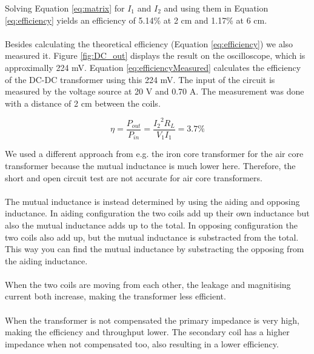 \documentclass[final]{scrreprt} %
\begin{document}
Solving Equation \ref{eq:matrix} for $I_1$ and $I_2$ and using them in Equation \ref{eq:efficiency} yields an efficiency of 5.14\% at 2 cm and 1.17\% at 6 cm.
\\ \\
Besides calculating the theoretical efficiency (Equation \ref{eq:efficiency}) we also measured it. Figure \ref{fig:DC_out} displays the result on the oscilloscope, which is approximally 224 mV. Equation \ref{eq:efficiencyMeasured} calculates the efficiency of the DC-DC transformer using this 224 mV. The input of the circuit is measured by the voltage source at 20 V and 0.70 A. The measurement was done with a distance of 2 cm between the coils.

\begin{equation}
	\eta = \frac{P_{out}}{P_{in}} = \frac{{I_2}^2 R_L}{V_1 I_1} = 3.7\%
	\label{eq:efficiencyMeasured}
\end{equation}

We used a different approach from e.g. the iron core transformer for the air core transformer because the mutual inductance is much lower here. Therefore, the short and open circuit test are not accurate for air core transformers.
\\ \\
The mutual inductance is instead determined by using the aiding and opposing inductance. In aiding configuration the two coils add up their own inductance but also the mutual inductance adds up to the total. In opposing configuration the two coils also add up, but the mutual inductance is substracted from the total. This way you can find the mutual inductance by substracting the opposing from the aiding inductance.
\\ \\
When the two coils are moving from each other, the leakage and magnitising current both increase, making the transformer less efficient.
\\ \\
When the transformer is not compensated the primary impedance is very high, making the efficiency and throughput lower. The secondary coil has a higher impedance when not compensated too, also resulting in a lower efficiency.
\end{document}
